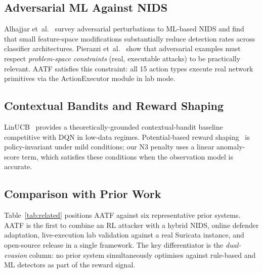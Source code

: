 \documentclass[sigconf]{acmart}
\begin{document}
\subsection{Adversarial ML Against NIDS}
\label{sec:bg:adversarial}

Alhajjar et~al.~\cite{alhajjar2021adversarial} survey adversarial
perturbations to ML-based NIDS and find that small feature-space
modifications substantially reduce detection rates across classifier
architectures. Pierazzi et~al.~\cite{pierazzi2020intriguing} show that
adversarial examples must respect \emph{problem-space constraints}
(real, executable attacks) to be practically relevant. AATF satisfies
this constraint: all 15 action types execute real network primitives
via the ActionExecutor module in lab mode.

\subsection{Contextual Bandits and Reward Shaping}
\label{sec:bg:linucb}

LinUCB~\cite{li2010contextual} provides a theoretically-grounded
contextual-bandit baseline competitive with DQN in low-data regimes.
Potential-based reward shaping~\cite{ng1999policy} is policy-invariant
under mild conditions; our N3 penalty uses a linear anomaly-score term,
which satisfies these conditions when the observation model is accurate.

\subsection{Comparison with Prior Work}
\label{sec:bg:comparison}

Table~\ref{tab:related} positions AATF against six representative prior
systems. AATF is the first to combine an RL attacker with a hybrid NIDS,
online defender adaptation, live-execution lab validation against a
real Suricata instance, and open-source release in a single framework.
The key differentiator is the
\emph{dual-evasion} column: no prior system simultaneously optimises
against rule-based and ML detectors as part of the reward signal.
\end{document}
